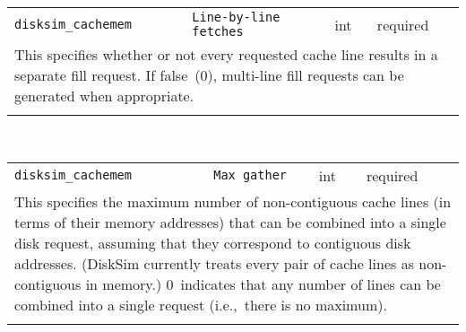 \noindent 
\begin{tabular}{|p{1.5in}|p{3.5in}|p{0.5in}|p{0.5in}|}
\cline{1-4}
\texttt{disksim\_cachemem} & \texttt{Line-by-line fetches} & int & required \\ 
\cline{1-4}
\multicolumn{4}{|p{6in}|}{
This specifies whether or not every requested cache line results in a
separate fill request. If false~(0), multi-line fill requests can be
generated when appropriate.
}\\ 
\cline{1-4}
\multicolumn{4}{p{5in}}{}\\
\end{tabular}\\ 
\noindent 
\begin{tabular}{|p{1.5in}|p{3.5in}|p{0.5in}|p{0.5in}|}
\cline{1-4}
\texttt{disksim\_cachemem} & \texttt{Max gather} & int & required \\ 
\cline{1-4}
\multicolumn{4}{|p{6in}|}{
This specifies the maximum number of non-contiguous cache lines (in terms
of their memory addresses)
that can be combined into a single disk request, assuming that they
correspond to contiguous disk addresses. (DiskSim currently treats
every pair of cache lines as non-contiguous in memory.)
0~indicates that any number of lines can be combined into a single
request (i.e.,~there is no maximum).
}\\ 
\cline{1-4}
\multicolumn{4}{p{5in}}{}\\
\end{tabular}\\ 
